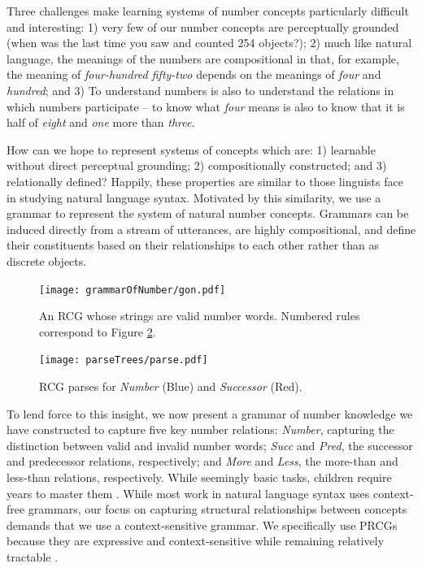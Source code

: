 \documentclass[10pt,letterpaper]{article}
\begin{document}
Three challenges make learning systems of number concepts particularly
difficult and interesting: 1) very few of our number concepts are
perceptually grounded (when was the last time you saw and counted 254
objects?); 2) much like natural language, the meanings of the numbers
are compositional in that, for example, the meaning of
\emph{four-hundred fifty-two} depends on the meanings of \emph{four}
and \emph{hundred}; and 3) To understand numbers is also to understand
the relations in which numbers participate -- to know what \emph{four}
means is also to know that it is half of \emph{eight} and \emph{one}
more than \emph{three}.

How can we hope to represent systems of concepts which are: 1)
learnable without direct perceptual grounding; 2) compositionally
constructed; and 3) relationally defined? Happily, these properties
are similar to those linguists face in studying natural language
syntax. Motivated by this similarity, we use a grammar to represent
the system of natural number concepts. Grammars can be induced
directly from a stream of utterances, are highly compositional, and
define their constituents based on their relationships to each other
rather than as discrete objects.

\begin{figure}[t]
  \begin{centering}
    \texttt{[image: grammarOfNumber/gon.pdf]}
    \caption{An RCG whose strings are valid number words. Numbered rules correspond to Figure \ref{fig:parse}.}
    \label{fig:gon}
  \end{centering}
\end{figure}

\begin{figure}[t]
  \begin{centering}
    \texttt{[image: parseTrees/parse.pdf]}
    \caption{RCG parses for \emph{Number} (Blue) and \emph{Successor} (Red).}
    \label{fig:parse}
  \end{centering}
\end{figure}

To lend force to this insight, we now present a grammar of number
knowledge we have constructed to capture five key number relations:
\emph{Number}, capturing the distinction between valid and invalid
number words; \emph{Succ} and \emph{Pred}, the successor and
predecessor relations, respectively; and \emph{More} and \emph{Less},
the more-than and less-than relations, respectively. While seemingly
basic tasks, children require years to master them
\citep{FusRicBriar1982}. While most work in natural language syntax
uses context-free grammars, our focus on capturing structural
relationships between concepts demands that we use a context-sensitive
grammar. We specifically use PRCGs because they are expressive and
context-sensitive while remaining relatively tractable
\citep{boullier2005range}.
\end{document}
